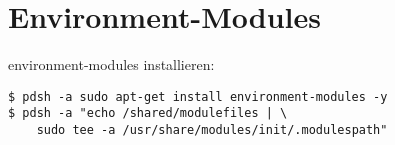 \chapter{Environment-Modules}
environment-modules installieren:
\begin{lstlisting}[style=Bash]
$ pdsh -a sudo apt-get install environment-modules -y
$ pdsh -a "echo /shared/modulefiles | \
	sudo tee -a /usr/share/modules/init/.modulespath"
\end{lstlisting}
